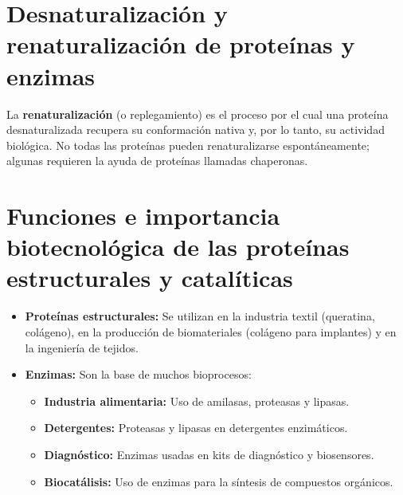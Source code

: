 \section{Desnaturalización y renaturalización de proteínas y enzimas}


La \textbf{renaturalización} (o replegamiento) es el proceso por el cual una proteína desnaturalizada recupera su conformación nativa y, por lo tanto, su actividad biológica. No todas las proteínas pueden renaturalizarse espontáneamente; algunas requieren la ayuda de proteínas llamadas chaperonas.


\section{Funciones e importancia biotecnológica de las proteínas estructurales y catalíticas}

\begin{itemize}
    \item \textbf{Proteínas estructurales:} Se utilizan en la industria textil (queratina, colágeno), en la producción de biomateriales (colágeno para implantes) y en la ingeniería de tejidos.
    \item \textbf{Enzimas:} Son la base de muchos bioprocesos:
    \begin{itemize}
        \item \textbf{Industria alimentaria:} Uso de amilasas, proteasas y lipasas.
        \item \textbf{Detergentes:} Proteasas y lipasas en detergentes enzimáticos.
        \item \textbf{Diagnóstico:} Enzimas usadas en kits de diagnóstico y biosensores.
        \item \textbf{Biocatálisis:} Uso de enzimas para la síntesis de compuestos orgánicos.
    \end{itemize}
\end{itemize}